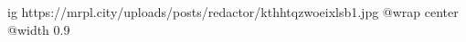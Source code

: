  
 
 
 
 

\ifcmt
  ig https://mrpl.city/uploads/posts/redactor/kthhtqzwoeixlsb1.jpg
  @wrap center
  @width 0.9
\fi
